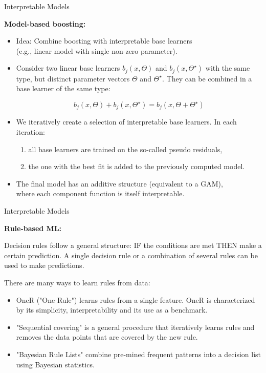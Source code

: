 \documentclass[aspectratio=169]{../latex_main/tntbeamer}  %
\begin{document}
\begin{frame}{Interpretable Models}
	
	
	\textbf{Model-based boosting:}
	
	\begin{itemize}
		
		\item Idea: Combine boosting with interpretable base learners\\
		 (e.g., linear model with single non-zero parameter).
		\pause
		\item Consider two linear base learners $b_j(x, \Theta)$ and $b_j(x, \Theta^{\star})$ with the same type, but distinct parameter vectors $\Theta$ and $\Theta^{\star}$. They can be combined in a base learner of the same type:
		
		$$
		b_j(x, \Theta) + b_j(x, \Theta^{\star}) = b_j(x, \Theta + \Theta^{\star})
		$$
		\pause
		\item We iteratively create a selection of interpretable base learners. In each iteration:
		\begin{enumerate}
			\item all base learners are trained on the so-called pseudo residuals,
			\item the one with the best fit is added to the previously computed model.
		\end{enumerate}  
		\pause
		\item The final model has an additive structure (equivalent to a GAM),\\ where each component function is itself interpretable.
	\end{itemize}
	
	
	
\end{frame}

\begin{frame}{Interpretable Models}
	
	
	\textbf{Rule-based ML:}
	
	
	Decision rules follow a general structure: IF the conditions are met THEN make a certain prediction. A single decision rule or a combination of several rules can be used to make predictions.
	
	\vspace{0.5cm}
	There are many ways to learn rules from data:
	\begin{itemize}
		\item OneR ("One Rule") learns rules from a single feature. OneR is characterized by its simplicity, interpretability and its use as a benchmark.
		\pause
		\item "Sequential covering" is a general procedure that iteratively learns rules and removes the data points that are covered by the new rule. %
		\pause
		\item "Bayesian Rule Lists" combine pre-mined frequent patterns into a decision list using Bayesian statistics. %
	\end{itemize}
	
\end{frame}
	
\end{document}
